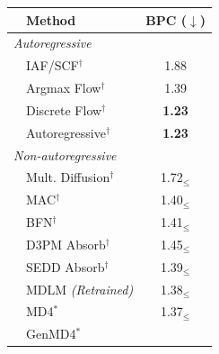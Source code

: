 \documentclass{article} %
\begin{document}
\begin{figure}
\begin{minipage}[t]{0.49\linewidth}
\centering
\small
{}
\label{tab:text8}
\begin{tabular}{llc}
    \toprule
    & Method & BPC ($\downarrow$) \\
    \midrule
    \multicolumn{3}{l}{\textit{Autoregressive}} \\
    & IAF/SCF$^\dagger$ 
    \scriptsize{\citep{ziegler2019latent}}
    & 1.88 \\
    & Argmax Flow$^\dagger$ 
    \scriptsize{\citep{hoogeboom2021argmax}}
    & 1.39 \\
    & Discrete Flow$^\dagger$ 
    \scriptsize{\citep{tran2019discrete}}
    & \textbf{1.23} \\
    & Autoregressive$^\dagger$ & \textbf{1.23} \\
    \multicolumn{3}{l}{\textit{Non-autoregressive}} \\
    & Mult. Diffusion$^\dagger$ 
    \scriptsize{\citep{hoogeboom2021argmax}}
    & 1.72$_\leq$ \\
    & MAC$^\dagger$
    \scriptsize{\citep{shih2022training}}
    & 1.40$_\leq$ \\
    & BFN$^\dagger$ 
    \scriptsize{\citep{graves2023bayesian}}
    & 1.41$_\leq$ \\
    & D3PM Absorb$^\dagger$ 
    \scriptsize{\citep{austin2021structured}}
    & 1.45$_\leq$ \\
    & SEDD Absorb$^\dagger$ 
    \scriptsize{\citep{lou2023discrete}}
    & 1.39$_\leq$ \\
    & MDLM
    \scriptsize{\citep{sahoo2024simple}}
    \textit{(Retrained)}
    & 1.38$_\leq$ \\
    & MD4$^\text{*}$
    \scriptsize{\citep{shi2024simplified}}
    & 1.37$_\leq$ \\
    & GenMD4$^*$
    \scriptsize{\citep{shi2024simplified}}

\end{tabular}
\end{minipage}
\end{figure}
\end{document}
